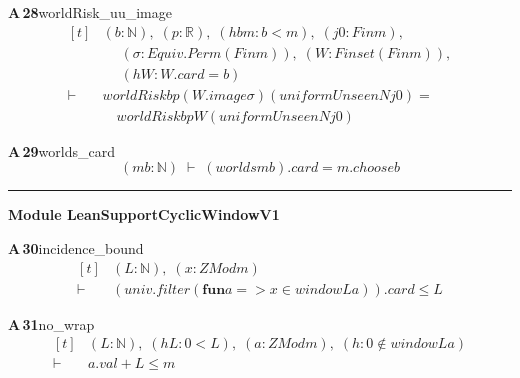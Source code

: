 \documentclass[conference]{IEEEtran}
\theoremstyle{definition}
\newcommand{\lean}[1]{\textsf{\footnotesize #1}}
\begin{document}
\noindent\textbf{A\,28}\quad\lean{worldRisk\_uu\_image}
{\footnotesize\[ \begin{aligned}[t]
&(\mathit{b} : \mathbb{N} ),\; (\mathit{p} : \mathbb{R} ),\; (\mathit{hbm} : \mathit{b} < \mathit{m}),\; (\mathit{j0} : \mathit{Fin} \mathit{m}),\\
&\quad \; (\sigma : \mathit{Equiv}.\mathit{Perm} (\mathit{Fin} \mathit{m})),\; (\mathit{W} : \mathit{Finset} (\mathit{Fin} \mathit{m})),\\
&\quad \; (\mathit{hW} : \mathit{W}.\mathit{card} = \mathit{b})\\
\vdash\;&\mathit{worldRisk} \mathit{b} \mathit{p} (\mathit{W}.\mathit{image} \sigma ) (\mathit{uniformUnseen} \mathit{N} \mathit{j0}) =\\
&\quad \mathit{worldRisk} \mathit{b} \mathit{p} \mathit{W} (\mathit{uniformUnseen} \mathit{N} \mathit{j0})
\end{aligned} \]}

\noindent\textbf{A\,29}\quad\lean{worlds\_card}
{\footnotesize\[ (\mathit{m} \mathit{b} : \mathbb{N} ) \;\vdash\; (\mathit{worlds} \mathit{m} \mathit{b}).\mathit{card} = \mathit{m}.\mathit{choose} \mathit{b} \]}

\vspace{4pt}\noindent\rule{\columnwidth}{0.4pt}\par\vspace{2pt}
\noindent\textbf{Module \lean{LeanSupportCyclicWindowV1}}\par\vspace{3pt}

\noindent\textbf{A\,30}\quad\lean{incidence\_bound}
{\footnotesize\[ \begin{aligned}[t]
&(\mathit{L} : \mathbb{N} ),\; (\mathit{x} : \mathit{ZMod} \mathit{m})\\
\vdash\;&(\mathit{univ}.\mathit{filter} (\mathbf{fun} \mathit{a} => \mathit{x} \in \mathit{window} \mathit{L} \mathit{a})).\mathit{card} \leq \mathit{L}
\end{aligned} \]}

\noindent\textbf{A\,31}\quad\lean{no\_wrap}
{\footnotesize\[ \begin{aligned}[t]
&(\mathit{L} : \mathbb{N} ),\; (\mathit{hL} : 0<\mathit{L}),\; (\mathit{a} : \mathit{ZMod} \mathit{m}),\; (\mathit{h} : 0 \notin \mathit{window} \mathit{L} \mathit{a})\\
\vdash\;&\mathit{a}.\mathit{val}+\mathit{L} \leq \mathit{m}
\end{aligned} \]}
\end{document}
